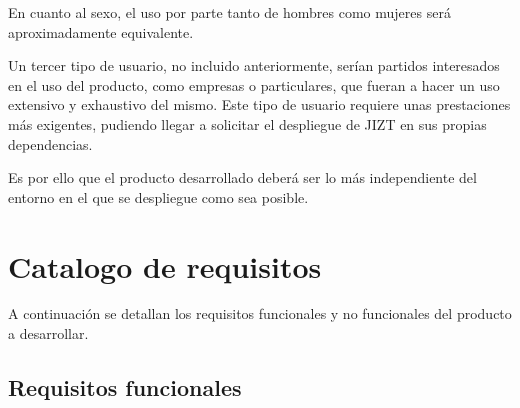 En cuanto al sexo, el uso por parte tanto de hombres como mujeres será aproximadamente equivalente.

Un tercer tipo de usuario, no incluido anteriormente, serían partidos interesados en el uso del producto, como empresas o particulares, que fueran a hacer un uso extensivo y exhaustivo del mismo. Este tipo de usuario requiere unas prestaciones más exigentes, pudiendo llegar a solicitar el despliegue de JIZT en sus propias dependencias.

Es por ello que el producto desarrollado deberá ser lo más independiente del entorno en el que se despliegue como sea posible.


\section{Catalogo de requisitos}

A continuación se detallan los requisitos funcionales y no funcionales del producto a desarrollar.

\subsection{Requisitos funcionales}

